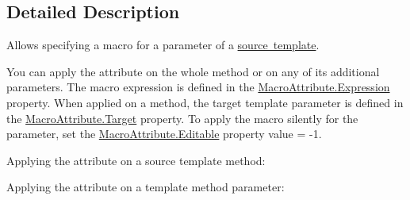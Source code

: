 \subsection{Detailed Description}
Allows specifying a macro for a parameter of a \mbox{\hyperlink{class_r_f_storage_1_1_source_template_attribute}{source template}}. 

You can apply the attribute on the whole method or on any of its additional parameters. The macro expression is defined in the \mbox{\hyperlink{class_r_f_storage_1_1_macro_attribute_ad83d620afa226d505e41e9ba1ee94289}{Macro\+Attribute.\+Expression}} property. When applied on a method, the target template parameter is defined in the \mbox{\hyperlink{class_r_f_storage_1_1_macro_attribute_a78ff3b444cf65ac2e858be45a8de9a02}{Macro\+Attribute.\+Target}} property. To apply the macro silently for the parameter, set the \mbox{\hyperlink{class_r_f_storage_1_1_macro_attribute_a2d233fa663b08429c167e4309725d4b8}{Macro\+Attribute.\+Editable}} property value = -\/1. 

Applying the attribute on a source template method\+: 
\begin{DoxyCode}{0}
\DoxyCodeLine{[SourceTemplate, Macro(\mbox{\hyperlink{class_r_f_storage_1_1_macro_attribute_a78ff3b444cf65ac2e858be45a8de9a02}{Target}} = \textcolor{stringliteral}{"item"}, \mbox{\hyperlink{class_r_f_storage_1_1_macro_attribute_ad83d620afa226d505e41e9ba1ee94289}{Expression}} = \textcolor{stringliteral}{"suggestVariableName()"})]}
\DoxyCodeLine{    \textcolor{comment}{//\$ \$END\$}}
\DoxyCodeLine{  \}}
\DoxyCodeLine{\}}
\end{DoxyCode}
 Applying the attribute on a template method parameter\+: 
\begin{DoxyCode}{0}
\DoxyCodeLine{[SourceTemplate]}
\DoxyCodeLine{  \textcolor{comment}{/*\$ var \$x\$Id = "\$newguid\$" + x.ToString();}}
\DoxyCodeLine{\textcolor{comment}{  x.DoSomething(\$x\$Id); */}}
\DoxyCodeLine{\}}
\end{DoxyCode}
 

